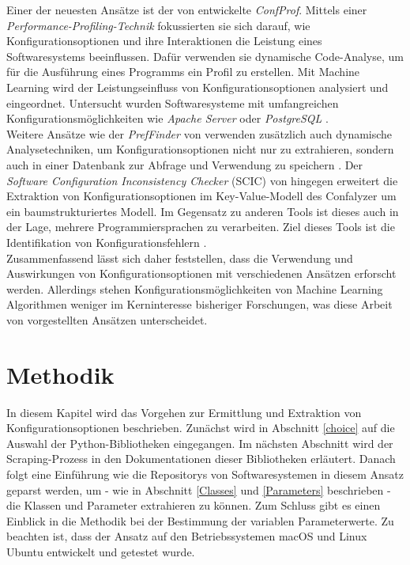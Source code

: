 \documentclass[german,bachelor]{swsLeipzig}
\begin{document}
\indent Einer der neuesten Ansätze ist der von \citeauthor{10.1145/3427921.3450255} entwickelte \textit{ConfProf}.
Mittels einer \textit{Performance-Profiling-Technik} fokussierten sie sich darauf, wie Konfigurationsoptionen und ihre Interaktionen
die Leistung eines Softwaresystems beeinflussen.
Dafür verwenden sie dynamische Code-Analyse, um für die Ausführung eines Programms ein Profil zu erstellen.
Mit Machine Learning wird der Leistungseinfluss von Konfigurationsoptionen analysiert und eingeordnet.
Untersucht wurden Softwaresysteme mit umfangreichen Konfigurationsmöglichkeiten wie \textit{Apache Server}
oder \textit{PostgreSQL}  \cite[]{10.1145/3427921.3450255}.\\
\indent Weitere Ansätze wie der \textit{PrefFinder} von \citeauthor{10.1145/2642937.2643009} verwenden zusätzlich auch dynamische
Analysetechniken, um Konfigurationsoptionen nicht nur zu extrahieren, sondern auch in einer Datenbank zur Abfrage und
Verwendung zu speichern \cite[]{10.1145/2642937.2643009}.
Der \textit{Software Configuration Inconsistency Checker} (SCIC) von \citeauthor{10.1145/2786805.2786869} hingegen
erweitert die Extraktion von Konfigurationsoptionen im Key-Value-Modell des Confalyzer um ein baumstrukturiertes Modell.
Im Gegensatz zu anderen Tools ist dieses auch in der Lage, mehrere Programmiersprachen zu verarbeiten.
Ziel dieses Tools ist die Identifikation von Konfigurationsfehlern \cite[]{10.1145/2786805.2786869}.\\
\indent Zusammenfassend lässt sich daher feststellen, dass die Verwendung und Auswirkungen von Konfigurationsoptionen mit
verschiedenen Ansätzen erforscht werden.
Allerdings stehen Konfigurationsmöglichkeiten von Machine Learning Algorithmen weniger im Kerninteresse bisheriger Forschungen,
was diese Arbeit von vorgestellten Ansätzen unterscheidet.

\chapter{Methodik}\label{Methodik}
In diesem Kapitel wird das Vorgehen zur Ermittlung und Extraktion von Konfigurationsoptionen
beschrieben.
Zunächst wird in Abschnitt \ref{choice} auf die Auswahl der Python-Bibliotheken eingegangen.
Im nächsten Abschnitt wird der Scraping-Prozess in den Dokumentationen dieser Bibliotheken erläutert.
Danach folgt eine Einführung wie die Repositorys von Softwaresystemen in diesem Ansatz geparst werden, um - wie in Abschnitt
\ref{Classes} und \ref{Parameters} beschrieben - die Klassen und Parameter extrahieren zu können.
Zum Schluss gibt es einen Einblick in die Methodik bei der Bestimmung der variablen Parameterwerte.
Zu beachten ist, dass der Ansatz auf den Betriebssystemen macOS und Linux Ubuntu entwickelt und getestet wurde.\\
\end{document}
